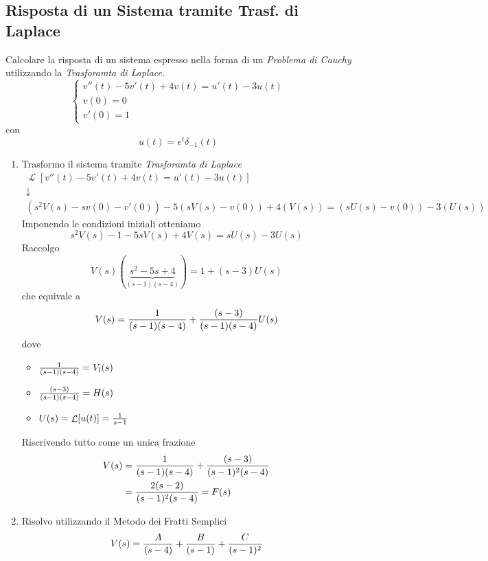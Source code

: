 \documentclass{article}
\newcommand{\Laplace}{\mathop{\mathcal{L}}}
\begin{document}
		\newpage
		\subsection{Risposta di un Sistema tramite Trasf. di Laplace}
			Calcolare la risposta di un sistema espresso nella forma di un \textit{Problema di Cauchy} utilizzando la \textit{Trasforamta di Laplace}.
			\[
				\begin{cases}
					v''(t) - 5v'(t) + 4v(t) = u'(t) - 3u(t) \\
					v(0) = 0 \\
					v'(0) = 1
				\end{cases}
			\]
			con
			\[
				u(t) = e^t \delta_{-1}(t)
			\]
			\begin{enumerate}
				\item Trasformo il sistema tramite \textit{Trasforamta di Laplace}
					  \[
					  	\begin{gathered}
							\Laplace[v''(t) - 5v'(t) + 4v(t) = u'(t) - 3u(t)] \\
							\downarrow \\
					  		(s^2V(s) - sv(0) - v'(0)) - 5(sV(s) - v(0)) + 4(V(s)) = (sU(s) - v(0)) - 3(U(s))
					  	\end{gathered}
					  \]
					  Imponendo le condizioni iniziali otteniamo
					  \[
					  	s^2V(s) - 1 - 5sV(s) + 4V(s) = sU(s) -3U(s)
					  \]
					  Raccolgo
					  \[
					  	V(s)(\underbrace{s^2 - 5s + 4}_{(s - 1)(s - 4)}) = 1 + (s - 3)U(s)
					  \]
					  che equivale a
					  \[
					  	V(s) = {{1}\over{(s - 1)(s - 4)}} + {{(s - 3)}\over{(s - 1)(s - 4)}}U(s)
					  \]
					  dove
					  \begin{itemize}
					  	\item $ {{1}\over{(s - 1)(s - 4)}} = V_l(s) $
						\item $ {{(s - 3)}\over{(s - 1)(s - 4)}} = H(s) $
						\item $ U(s) = \Laplace[u(t)] = {{1}\over{s - 1}} $
					  \end{itemize}
					  Riscrivendo tutto come un unica frazione
					  \[
					  	\begin{aligned}
							V(s) &= {{1}\over{(s - 1)(s - 4)}} + {{(s - 3)}\over{(s - 1)^2(s - 4)}} \\
					  		&= {{2(s - 2)}\over{(s - 1)^2(s - 4)}} = F(s) \\
					  	\end{aligned}
					  \]
				\item Risolvo utilizzando il Metodo dei Fratti Semplici
				 	  \[
					  	V(s) = {{A}\over{(s - 4)}} + {{B}\over{(s - 1)}} + {{C}\over{(s - 1)^2}}
\]
\end{enumerate}
\end{document}
